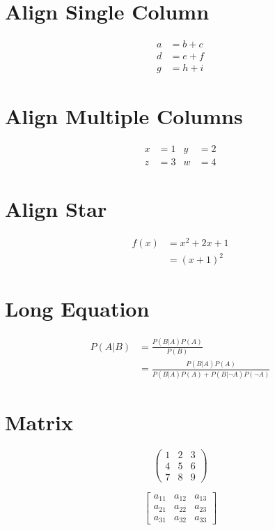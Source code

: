 \documentclass{article}
\begin{document}
\section{Align Single Column}
\begin{align}
a &= b + c \\
d &= e + f \\
g &= h + i
\end{align}

\section{Align Multiple Columns}
\begin{align}
x & = 1 & y & = 2 \\
z & = 3 & w & = 4
\end{align}

\section{Align Star}
\begin{align*}
f(x) & = x^2 + 2x + 1 \\
     & = (x+1)^2
\end{align*}

\section{Long Equation}
\begin{align}
P(A|B) &= \frac{P(B|A) P(A)}{P(B)} \\
       &= \frac{P(B|A) P(A)}{P(B|A) P(A) + P(B|\neg A) P(\neg A)}
\end{align}

\section{Matrix}
\begin{equation}
\begin{pmatrix}
1 & 2 & 3 \\
4 & 5 & 6 \\
7 & 8 & 9
\end{pmatrix}
\end{equation}

\begin{equation}
\begin{bmatrix}
a_{11} & a_{12} & a_{13} \\
a_{21} & a_{22} & a_{23} \\
a_{31} & a_{32} & a_{33}
\end{bmatrix}
\end{equation}
\end{document}
